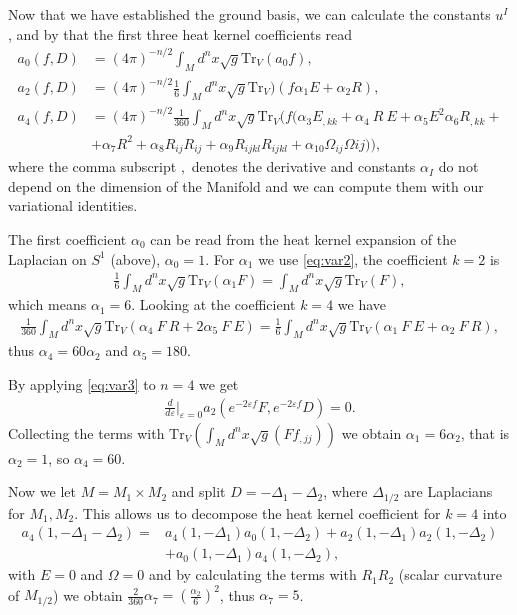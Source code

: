 Now that we have established the ground basis, we can calculate the constants
$u^I$, and by that the first three heat kernel coefficients read
\begin{align}
    a_0(f, D) &= (4\pi)^{-n/2}\int_Md^n x\sqrt{g} \text{Tr}_V(a_0 f),\\
    a_2(f, D) &= (4\pi)^{-n/2}\frac{1}{6}\int_Md^n
    x\sqrt{g}\text{Tr}_V)(f\alpha _1 E+\alpha _2 R),\\
    a_4(f, D) &= (4\pi)^{-n/2}\frac{1}{360}\int_Md^n
    x\sqrt{g}\text{Tr}_V(f(\alpha_3 E_{,kk} + \alpha_4\ R\ E + \alpha_5 E^2
    \alpha_6 R_{,kk} + \\
    &+\alpha_7 R^2 + \alpha_8 R_{ij}R_{ij} + \alpha_9
    R_{ijkl}R_{ijkl} +\alpha_{10} \Omega_{ij}\Omega{ij})),
\end{align}
where the comma subscript $,$ denotes the derivative and constants $\alpha_I$
do not depend on the dimension of the Manifold and we can compute them with
our variational identities.

The first coefficient $\alpha_0$ can be read from the heat kernel expansion of
the Laplacian on $S^1$ (above), $\alpha_0 = 1$. For $\alpha_1$ we use
\ref{eq:var2}, the coefficient $k = 2$ is
\begin{align}
    \frac{1}{6} \int_M d^n x\sqrt{g} \text{Tr}_V(\alpha_1F) = \int_M d^n
    x\sqrt{g} \text{Tr}_V(F),
\end{align}
which means $\alpha_1 = 6$. Looking at the coefficient $k=4$ we have
\begin{align}
    \frac{1}{360}\int_Md^n x \sqrt{g}\text{Tr}_V(\alpha_4\ F\ R + 2\alpha_5\ F\ E)
    = \frac{1}{6} \int_Md^n x\sqrt{g}\text{Tr}_V(\alpha_1\ F\ E + \alpha_2\ F\ R),
\end{align}
thus $\alpha_4 = 60\alpha_2$ and $\alpha_5 = 180$.

By applying  \ref{eq:var3} to $n=4$ we get
\begin{align}
    \frac{d}{d\varepsilon}|_{\varepsilon=0} a_2(e^{-2\varepsilon f}F,
    e^{-2\varepsilon f}D) = 0.
\end{align}
Collecting the terms with $\text{Tr}_V(\int_Md^nx\sqrt{g}(Ff_{,jj}))$ we
obtain $\alpha_1 = 6\alpha_2$, that is $\alpha_2 = 1$, so $\alpha_4 = 60$.

Now we let $M=M_1\times M_2$ and split $D = -\Delta_1 -\Delta_2$, where
$\Delta_{1/2}$ are Laplacians for $M_1, M_2$. This allows us to decompose the heat
kernel coefficient for $k=4$ into
\begin{align}
    a_4(1,-\Delta_1-\Delta_2) =& a_4(1, -\Delta_1) a_0(1, -\Delta_2)
    +a_2(1,-\Delta_1) a_2(1,-\Delta_2) \\&+ a_0(1,-\Delta_1)
    a_4(1,-\Delta_2),
\end{align}
with $E=0$ and $\Omega =0$ and by calculating the terms with $R_1R_2$  (scalar
curvature of $M_{1/2}$) we obtain $\frac{2}{360}\alpha_7 =
(\frac{\alpha_2}{6})^2$, thus $\alpha_7 = 5$.

